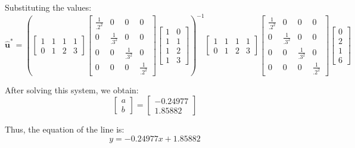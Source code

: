 \documentclass[11pt]{article}
\begin{document}
Substituting the values:
\[
\hat{\mathbf{u}}^* = 
\left( 
\begin{bmatrix} 
1 & 1 & 1 & 1 \\ 
0 & 1 & 2 & 3 
\end{bmatrix}
\begin{bmatrix}
\frac{1}{.2^2} & 0 & 0 & 0 \\
0 & \frac{1}{.3^2} & 0 & 0 \\
0 & 0 & \frac{1}{.3^2} & 0 \\
0 & 0 & 0 & \frac{1}{.2^2}
\end{bmatrix}
\begin{bmatrix} 
1 & 0 \\
1 & 1 \\
1 & 2 \\
1 & 3 
\end{bmatrix}
\right)^{-1}
\begin{bmatrix} 
1 & 1 & 1 & 1 \\ 
0 & 1 & 2 & 3 
\end{bmatrix}
\begin{bmatrix}
\frac{1}{.2^2} & 0 & 0 & 0 \\
0 & \frac{1}{.3^2} & 0 & 0 \\
0 & 0 & \frac{1}{.3^2} & 0 \\
0 & 0 & 0 & \frac{1}{.2^2}
\end{bmatrix}
\begin{bmatrix}
0 \\
2 \\
1 \\
6
\end{bmatrix}
\]

After solving this system, we obtain:
\[
\begin{bmatrix}
a \\
b
\end{bmatrix} =
\begin{bmatrix}
-0.24977 \\
1.85882
\end{bmatrix}
\]

Thus, the equation of the line is:
\[\boxed{
y = -0.24977x + 1.85882}
\]
\end{document}
